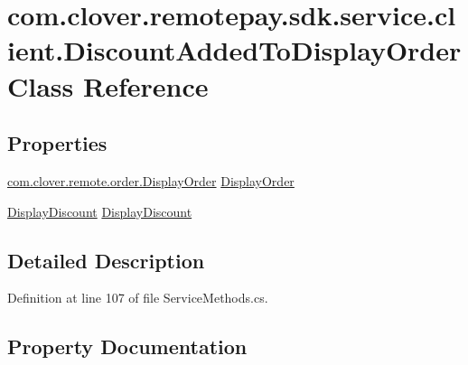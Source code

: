\hypertarget{classcom_1_1clover_1_1remotepay_1_1sdk_1_1service_1_1client_1_1_discount_added_to_display_order}{}\section{com.\+clover.\+remotepay.\+sdk.\+service.\+client.\+Discount\+Added\+To\+Display\+Order Class Reference}
\label{classcom_1_1clover_1_1remotepay_1_1sdk_1_1service_1_1client_1_1_discount_added_to_display_order}
\subsection*{Properties}
\begin{DoxyCompactItemize}
\item 
\hyperlink{classcom_1_1clover_1_1remote_1_1order_1_1_display_order}{com.\+clover.\+remote.\+order.\+Display\+Order} \hyperlink{classcom_1_1clover_1_1remotepay_1_1sdk_1_1service_1_1client_1_1_discount_added_to_display_order_a6b39399dc9731b4f7f76534c392d12ca}{Display\+Order}
\item 
\hyperlink{classcom_1_1clover_1_1remote_1_1order_1_1_display_discount}{Display\+Discount} \hyperlink{classcom_1_1clover_1_1remotepay_1_1sdk_1_1service_1_1client_1_1_discount_added_to_display_order_ad4441f32d0bd3b5b9d68d408a100ff75}{Display\+Discount}
\end{DoxyCompactItemize}


\subsection{Detailed Description}


Definition at line 107 of file Service\+Methods.\+cs.



\subsection{Property Documentation}
\mbox{\label{classcom_1_1clover_1_1remotepay_1_1sdk_1_1service_1_1client_1_1_discount_added_to_display_order_ad4441f32d0bd3b5b9d68d408a100ff75}} 
